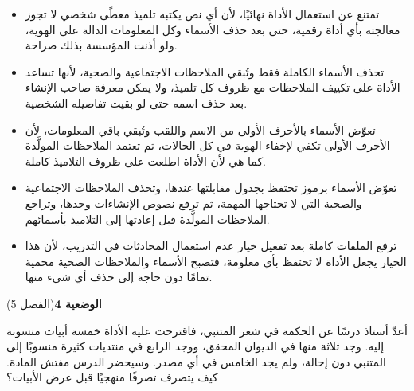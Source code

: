 \documentclass[11pt,a4paper]{article}
\begin{document}
\begin{itemize}[leftmargin=1.0cm, labelsep=6pt, itemsep=3pt, topsep=4pt, parsep=0pt]
  \item[\textbf{أ)}] تمتنع عن استعمال الأداة نهائيًا، لأن أي نص يكتبه تلميذ معطًى شخصي لا تجوز معالجته بأي أداة رقمية، حتى بعد حذف الأسماء وكل المعلومات الدالة على الهوية، ولو أذنت المؤسسة بذلك صراحة.
  \item[\textbf{ب)}] تحذف الأسماء الكاملة فقط وتُبقي الملاحظات الاجتماعية والصحية، لأنها تساعد الأداة على تكييف الملاحظات مع ظروف كل تلميذ، ولا يمكن معرفة صاحب الإنشاء بعد حذف اسمه حتى لو بقيت تفاصيله الشخصية.
  \item[\textbf{ج)}] تعوّض الأسماء بالأحرف الأولى من الاسم واللقب وتُبقي باقي المعلومات، لأن الأحرف الأولى تكفي لإخفاء الهوية في كل الحالات، ثم تعتمد الملاحظات المولَّدة كما هي لأن الأداة اطلعت على ظروف التلاميذ كاملة.
  \item[\textbf{د)}] تعوّض الأسماء برموز تحتفظ بجدول مقابلتها عندها، وتحذف الملاحظات الاجتماعية والصحية التي لا تحتاجها المهمة، ثم ترفع نصوص الإنشاءات وحدها، وتراجع الملاحظات المولَّدة قبل إعادتها إلى التلاميذ بأسمائهم.
  \item[\textbf{هـ)}] ترفع الملفات كاملة بعد تفعيل خيار عدم استعمال المحادثات في التدريب، لأن هذا الخيار يجعل الأداة لا تحتفظ بأي معلومة، فتصبح الأسماء والملاحظات الصحية محمية تمامًا دون حاجة إلى حذف أي شيء منها.
\end{itemize}
\par\vspace{6pt}
\noindent
{\large\khatt\textbf{الوضعية 4}}\hfill{\small(الفصل 5)}\par\nopagebreak\vspace{3pt}
\setlength{\fboxsep}{7pt}\colorbox{gray!10}{\parbox{\dimexpr\linewidth-14pt}{أعدّ أستاذ درسًا عن الحكمة في شعر المتنبي، فاقترحت عليه الأداة خمسة أبيات منسوبة إليه. وجد ثلاثة منها في الديوان المحقق، ووجد الرابع في منتديات كثيرة منسوبًا إلى المتنبي دون إحالة، ولم يجد الخامس في أي مصدر. وسيحضر الدرس مفتش المادة. كيف يتصرف تصرفًا منهجيًا قبل عرض الأبيات؟}}\par\nopagebreak
\end{document}
